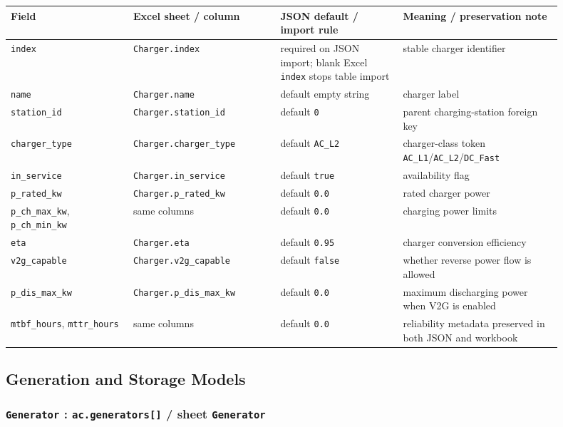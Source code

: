 \begin{longtable}{L{0.20\linewidth}L{0.24\linewidth}L{0.20\linewidth}L{0.26\linewidth}}
\toprule
Field & Excel sheet / column & JSON default / import rule & Meaning / preservation note \\
\midrule
\endhead
\texttt{index} & \texttt{Charger.index} & required on JSON import; blank Excel \texttt{index} stops table import & stable charger identifier \\
\texttt{name} & \texttt{Charger.name} & default empty string & charger label \\
\texttt{station\_id} & \texttt{Charger.station\_id} & default \texttt{0} & parent charging-station foreign key \\
\texttt{charger\_type} & \texttt{Charger.charger\_type} & default \texttt{AC\_L2} & charger-class token \texttt{AC\_L1}/\texttt{AC\_L2}/\texttt{DC\_Fast} \\
\texttt{in\_service} & \texttt{Charger.in\_service} & default \texttt{true} & availability flag \\
\texttt{p\_rated\_kw} & \texttt{Charger.p\_rated\_kw} & default \texttt{0.0} & rated charger power \\
\texttt{p\_ch\_max\_kw}, \texttt{p\_ch\_min\_kw} & same columns & default \texttt{0.0} & charging power limits \\
\texttt{eta} & \texttt{Charger.eta} & default \texttt{0.95} & charger conversion efficiency \\
\texttt{v2g\_capable} & \texttt{Charger.v2g\_capable} & default \texttt{false} & whether reverse power flow is allowed \\
\texttt{p\_dis\_max\_kw} & \texttt{Charger.p\_dis\_max\_kw} & default \texttt{0.0} & maximum discharging power when V2G is enabled \\
\texttt{mtbf\_hours}, \texttt{mttr\_hours} & same columns & default \texttt{0.0} & reliability metadata preserved in both JSON and workbook \\
\bottomrule
\end{longtable}

\subsection{Generation and Storage Models}

\subsubsection*{\texttt{Generator} : \texttt{ac.generators[]} / sheet \texttt{Generator}}

